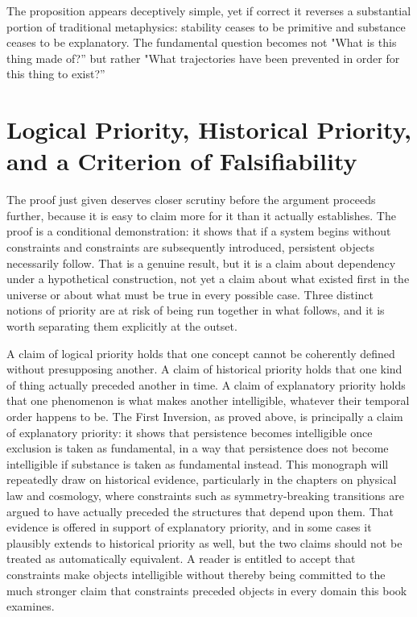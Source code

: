 \documentclass[11pt,oneside]{book}
\theoremstyle{plain}
\theoremstyle{definition}
\theoremstyle{remark}
\begin{document}
The proposition appears deceptively simple, yet if correct it reverses a substantial portion of traditional metaphysics: stability ceases to be primitive and substance ceases to be explanatory. The fundamental question becomes not "What is this thing made of?'' but rather "What trajectories have been prevented in order for this thing to exist?''

\section{Logical Priority, Historical Priority, and a Criterion of Falsifiability}

The proof just given deserves closer scrutiny before the argument proceeds further, because it is easy to claim more for it than it actually establishes. The proof is a conditional demonstration: it shows that if a system begins without constraints and constraints are subsequently introduced, persistent objects necessarily follow. That is a genuine result, but it is a claim about dependency under a hypothetical construction, not yet a claim about what existed first in the universe or about what must be true in every possible case. Three distinct notions of priority are at risk of being run together in what follows, and it is worth separating them explicitly at the outset.

A claim of logical priority holds that one concept cannot be coherently defined without presupposing another. A claim of historical priority holds that one kind of thing actually preceded another in time. A claim of explanatory priority holds that one phenomenon is what makes another intelligible, whatever their temporal order happens to be. The First Inversion, as proved above, is principally a claim of explanatory priority: it shows that persistence becomes intelligible once exclusion is taken as fundamental, in a way that persistence does not become intelligible if substance is taken as fundamental instead. This monograph will repeatedly draw on historical evidence, particularly in the chapters on physical law and cosmology, where constraints such as symmetry-breaking transitions are argued to have actually preceded the structures that depend upon them. That evidence is offered in support of explanatory priority, and in some cases it plausibly extends to historical priority as well, but the two claims should not be treated as automatically equivalent. A reader is entitled to accept that constraints make objects intelligible without thereby being committed to the much stronger claim that constraints preceded objects in every domain this book examines.
\end{document}
